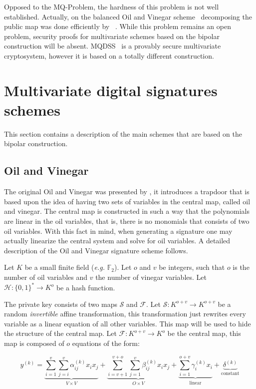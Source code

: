 \documentclass{ufsctex/ufsctex}
\begin{document}
Opposed to the MQ-Problem, the hardness of this problem is not well
established. Actually, on the balanced Oil and Vinegar
scheme~\cite{patarin1997ov} decomposing the public map was done efficiently by
~\cite{kipnis1998cryptanalysis}. While this problem remains an open problem,
security proofs for multivariate schemes based on the bipolar construction will
be absent. MQDSS~\cite{chen20165} is a provably secure multivariate cryptosystem,
however it is based on a totally different construction.

\section{Multivariate digital signatures schemes}

This section contains a description of the main schemes that are based on the
bipolar construction.

\subsection{Oil and Vinegar}\label{sec:ov}

The original Oil and Vinegar was presented by \cite{patarin1997ov}, it
introduces a trapdoor that is based upon the idea of having two sets of
variables in the central map, called oil and vinegar. The central map is
constructed in such a way that the polynomials are linear in the oil variables,
that is, there is no monomials that consists of two oil variables. With this
fact in mind, when generating a signature one may actually linearize the
central system and solve for oil variables. A detailed description of the Oil
and Vinegar signature scheme follows.

Let $K$ be a small finite field (\textit{e.g.} $\mathbb{F}_2$). Let $o$ and $v$
be integers, such that $o$ is the number of oil variables and $v$ the number of
vinegar variables. Let $\mathcal{H}: \{0,1\}^* \to K^o$ be a hash function.

The private key consists of two maps $\mathcal{S}$ and $\mathcal{F}$. Let
$\mathcal{S}: K^{o+v} \to K^{o+v}$ be a random \textit{invertible} affine
transformation, this transformation just rewrites every variable as a linear
equation of all other variables. This map will be used to hide the structure of
the central map. Let $\mathcal{F}: K^{o+v} \to K^{o}$ be the central map, this
map is composed of $o$ equations of the form:

\begin{equation}\label{eq:ovpolynomial}
y^{(k)} =
\underbrace{\sum_{i=1}^{v}\sum_{j=i}^{v} \alpha^{(k)}_{ij} x_i x_j}_{
V \times V} +
\underbrace{\sum_{i=v+1}^{v+o}\sum_{j=1}^{v} \beta^{(k)}_{ij} x_i x_j}_{
O \times V} +
\underbrace{\sum_{i=1}^{o+v} \gamma^{(k)}_{i} x_i}_{\text{linear}} +
\underbrace{\delta^{(k)}}_{\text{constant}}
\end{equation}
\end{document}
